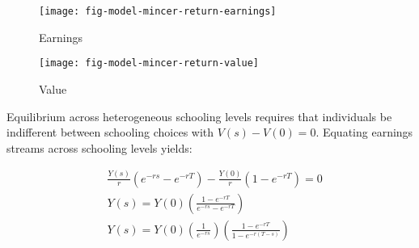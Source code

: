 \begin{frame}
\begin{figure}[htp]\centering
\caption{Earnings}\scalebox{0.35}
{\texttt{[image: fig-model-mincer-return-earnings]}}
\end{figure}
\end{frame}
\begin{frame}
\begin{figure}[htp]\centering
\caption{Value}\scalebox{0.35}
{\texttt{[image: fig-model-mincer-return-value]}}
\end{figure}
\end{frame}
\begin{frame}

Equilibrium across heterogeneous schooling levels requires that individuals be indifferent between schooling choices with $V(s) - V(0) = 0$. Equating earnings streams across schooling levels yields:

\begin{align*}
& \frac{Y(s)}{r} \left(e^{-rs}  - e^{-rT} \right) - \frac{Y(0)}{r} \left(1  - e^{-rT} \right)  = 0\\
& Y(s)  = Y(0) \left(\frac{1  - e^{-rT} }{e^{-rs} - e^{-rT}}\right) \\
& Y(s)  = Y(0) \left(\frac{1}{e^{-rs}}\right)\left(\frac{1  - e^{-rT} }{1 - e^{-r(T - s)}}\right) \\
\end{align*}
\end{frame}

